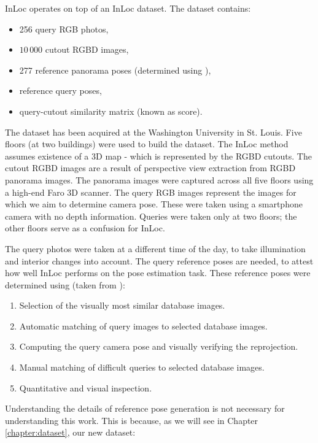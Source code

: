 \documentclass[twoside]{ctuthesis}
\theoremstyle{plain}
\theoremstyle{definition}
\theoremstyle{note}
\begin{document}
InLoc operates on top of an InLoc dataset. The dataset contains:

\begin{itemize}
	\item 256 query RGB photos,
	\item $10\,000$ cutout RGBD images,
	\item 277 reference panorama poses (determined using \cite{wijmans17rgbd}),
	\item reference query poses,
	\item query-cutout similarity matrix (known as score).
\end{itemize}

The dataset has been acquired at the Washington University in St. Louis. Five floors (at two buildings) were used to build the dataset. The InLoc method assumes existence of a 3D map - which is represented by the RGBD cutouts. The cutout RGBD images are a result of perspective view extraction from RGBD panorama images. The panorama images were captured across all five floors using a high-end Faro 3D scanner. The query RGB images represent the images for which we aim to determine camera pose. These were taken using a smartphone camera with no depth information. Queries were taken only at two floors; the other floors serve as a confusion for InLoc.

The query photos were taken at a different time of the day, to take illumination and interior changes into account. The query reference poses are needed, to attest how well InLoc performs on the pose estimation task. These reference poses were determined using (taken from \cite{taira2018inloc}):

\begin{enumerate}
	\item Selection of the visually most similar database images.
	\item Automatic matching of query images to selected database images.
	\item Computing the query camera pose and visually verifying the reprojection.
	\item Manual matching of difficult queries to selected database images.
	\item Quantitative and visual inspection.
\end{enumerate}

Understanding the details of reference pose generation is not necessary for understanding this work. This is because, as we will see in Chapter \ref{chapter:dataset}, our new dataset:
\end{document}
